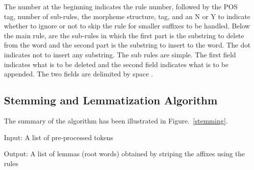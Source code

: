 \documentclass[conference]{IEEEtran}
\begin{document}
The number at the beginning indicates the rule number, followed by the POS tag, 
number of sub-rules, the morpheme structure, tag, and an N or Y to indicate 
whether to ignore or not to skip the rule for smaller suffixes to be handled.
Below the main rule, are the sub-rules in which the first part is the substring 
to delete from the word and the second part is the substring to insert to the 
word. The dot indicates not to insert any substring.
The sub rules are simple. The first field indicates what
is to be deleted and 
the second field indicates what is
to be appended. The two fields are delimited
by space \cite{r10}.

\subsection {Stemming and Lemmatization Algorithm}

The summary of the algorithm has been illustrated in Figure.~\ref{stemming}.

\medskip
Input: A list of pre-processed tokens 

\medskip
Output: A list of lemmas (root words) obtained by striping the affixes using the rules
\medskip
\end{document}
